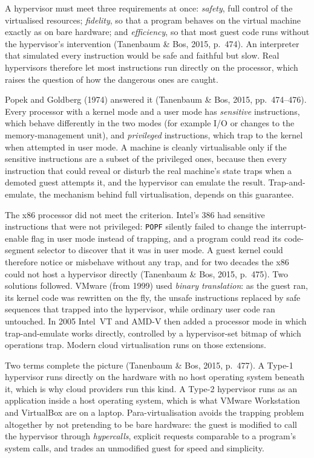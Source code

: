 A hypervisor must meet three requirements at once: \emph{safety}, full
control of the virtualised resources; \emph{fidelity}, so that a program
behaves on the virtual machine exactly as on bare hardware; and
\emph{efficiency}, so that most guest code runs without the hypervisor's
intervention (Tanenbaum \& Bos, 2015, p.~474). An interpreter that simulated
every instruction would be safe and faithful but slow. Real hypervisors
therefore let most instructions run directly on the processor, which raises
the question of how the dangerous ones are caught.

Popek and Goldberg (1974) answered it (Tanenbaum \& Bos, 2015,
pp.~474--476). Every processor with a kernel mode and a user mode has
\emph{sensitive} instructions, which behave differently in the two modes
(for example I/O or changes to the memory-management unit), and
\emph{privileged} instructions, which trap to the kernel when attempted in
user mode. A machine is cleanly virtualisable only if the sensitive
instructions are a subset of the privileged ones, because then every
instruction that could reveal or disturb the real machine's state traps when
a demoted guest attempts it, and the hypervisor can emulate the result.
Trap-and-emulate, the mechanism behind full virtualisation, depends on this
guarantee.

The x86 processor did not meet the criterion. Intel's 386 had sensitive
instructions that were not privileged: \texttt{POPF} silently failed to
change the interrupt-enable flag in user mode instead of trapping, and a
program could read its code-segment selector to discover that it was in user
mode. A guest kernel could therefore notice or misbehave without any trap,
and for two decades the x86 could not host a hypervisor directly (Tanenbaum
\& Bos, 2015, p.~475). Two solutions followed. VMware (from 1999) used
\emph{binary translation}: as the guest ran, its kernel code was rewritten
on the fly, the unsafe instructions replaced by safe sequences that trapped
into the hypervisor, while ordinary user code ran untouched. In 2005 Intel~VT
and AMD-V then added a processor mode in which trap-and-emulate works
directly, controlled by a hypervisor-set bitmap of which operations trap.
Modern cloud virtualisation runs on those extensions.

Two terms complete the picture (Tanenbaum \& Bos, 2015, p.~477). A Type-1
hypervisor runs directly on the hardware with no host operating system
beneath it, which is why cloud providers run this kind. A Type-2 hypervisor
runs as an application inside a host operating system, which is what VMware
Workstation and VirtualBox are on a laptop. Para-virtualisation avoids the
trapping problem altogether by not pretending to be bare hardware: the
guest is modified to call the hypervisor through \emph{hypercalls},
explicit requests comparable to a program's system calls, and trades an
unmodified guest for speed and simplicity.

